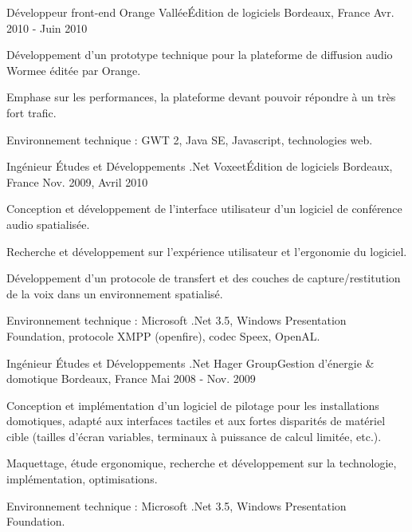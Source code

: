 \begin{cventries}
  \cventry
    {Développeur front-end}
    {Orange Vallée{\enskip\cdotp\enskip}Édition de logiciels}
    {Bordeaux, France}
    {Avr. 2010 - Juin 2010}
    {
      \begin{cvitems}
        \item {Développement d'un prototype technique pour la plateforme de diffusion audio Wormee éditée par Orange.}
        \item {Emphase sur les performances, la plateforme devant pouvoir répondre à un très fort trafic.}
        \item {Environnement technique : GWT 2, Java SE, Javascript, technologies web.}
      \end{cvitems}
    }

  \cventry
    {Ingénieur Études et Développements .Net}
    {Voxeet{\enskip\cdotp\enskip}Édition de logiciels}
    {Bordeaux, France}
    {Nov. 2009, Avril 2010}
    {
      \begin{cvitems}
        \item {Conception et développement de l'interface utilisateur d'un logiciel de conférence audio spatialisée.}
        \item {Recherche et développement sur l'expérience utilisateur et l'ergonomie du logiciel.}
        \item {Développement d'un protocole de transfert et des couches de capture/restitution de la voix dans un environnement spatialisé.}
        \item {Environnement technique : Microsoft .Net 3.5, Windows Presentation Foundation, protocole XMPP (openfire), codec Speex, OpenAL.}
      \end{cvitems}
    }

  \cventry
    {Ingénieur Études et Développements .Net}
    {Hager Group{\enskip\cdotp\enskip}Gestion d'énergie \& domotique}
    {Bordeaux, France}
    {Mai 2008 - Nov. 2009}
    {
      \begin{cvitems}
        \item {Conception et implémentation d'un logiciel de pilotage pour les installations domotiques, adapté aux interfaces tactiles et aux fortes disparités de matériel cible (tailles d'écran variables, terminaux à puissance de calcul limitée, etc.).}
        \item {Maquettage, étude ergonomique, recherche et développement sur la technologie,  implémentation, optimisations.}
        \item {Environnement technique : Microsoft .Net 3.5, Windows Presentation Foundation.}
      \end{cvitems}
    }


\end{cventries}
